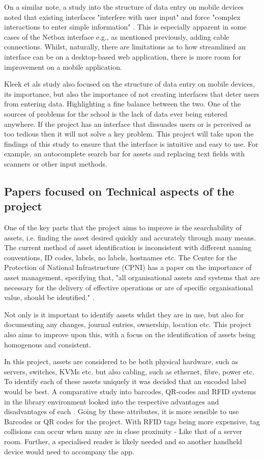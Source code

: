 \documentclass [11pt,a4paper]{article}
\begin{document}
On a similar note, a study into the structure of data entry on mobile devices noted that existing interfaces "interfere with user input" and force "complex interactions to enter simple information" \cite{van2007gui}. This is especially apparent in some cases of the Netbox interface e.g., as mentioned previously, adding cable connections. Whilst, naturally, there are limitations as to how streamlined an interface can be on a desktop-based web application, there is more room for improvement on a mobile application.
\pagebreak

Kleek et als \cite{van2007gui} study also focused on the structure of data entry on mobile devices, its importance, but also the importance of not creating interfaces that deter users from entering data. Highlighting a fine balance between the two. One of the sources of problems for the school is the lack of data ever being entered anywhere. If the project has an interface that dissuades users or is perceived as too tedious then it will not solve a key problem. This project will take upon the findings of this study to ensure that the interface is intuitive and easy to use. For example, an autocomplete search bar for assets and replacing text fields with scanners or other input methods. 

\subsection{Papers focused on Technical aspects of the project}
\label{sec:technical}

One of the key parts that the project aims to improve is the searchability of assets, i.e. finding the asset desired quickly and accurately through many means. The current method of asset identification is inconsistent with different naming conventions, ID codes, labels, no labels, hostnames etc. The Centre for the Protection of National Infrastructure (CPNI) has a paper on the importance of asset management, specifying that, "all organisational assets and systems that are necessary for the delivery of effective operations or are of specific organisational value, should be identified." \cite{cpni}.

Not only is it important to identify assets whilst they are in use, but also for documenting any changes, journal entries, ownership, location etc. This project also aims to improve upon this, with a focus on the identification of assets being homogenous and consistent.

In this project, assets are considered to be both physical hardware, such as servers, switches, KVMs etc. but also cabling, such as ethernet, fibre, power etc. To identify each of these assets uniquely it was decided that an encoded label would be best. A comparative study into barcodes, QR-codes and RFID systems in the library environment looked into the respective advantages and disadvantages of each \cite{lotlikar2013comparative}. Going by these attributes, it is more sensible to use Barcodes or QR codes for the project. With RFID tags being more expensive, tag collisions can occur when many are in close proximity\cite{lotlikar2013comparative} - Like that of a server room. Further, a specialised reader is likely needed and so another handheld device would need to accompany the app.
\end{document}
